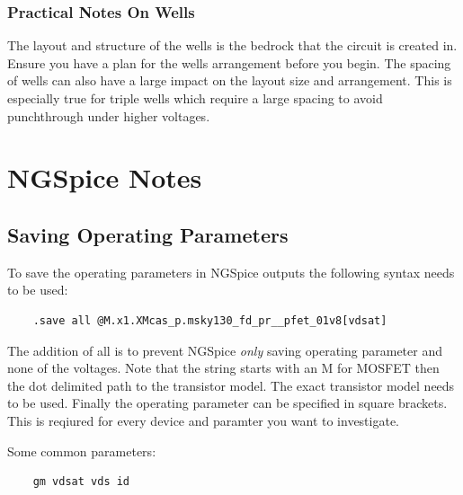 \documentclass[11pt]{article}
\begin{document}
\subsubsection{Practical Notes On Wells}

The layout and structure of the wells is the bedrock that the circuit is created in. Ensure you have a plan for the wells arrangement before you begin. The spacing of wells can also have a large impact on the layout size and arrangement. This is especially true for triple wells which require a large spacing to avoid punchthrough under higher voltages.






\newpage
\section{NGSpice Notes}

\subsection{Saving Operating Parameters}

To save the operating parameters in NGSpice outputs the following syntax needs to be used:

\begin{lstlisting}
    .save all @M.x1.XMcas_p.msky130_fd_pr__pfet_01v8[vdsat]
\end{lstlisting}

The addition of all is to prevent NGSpice \textit{only} saving operating parameter and none of the voltages. Note that the string starts with an M for MOSFET then the dot delimited path to the transistor model. The exact transistor model needs to be used. Finally the operating parameter can be specified in square brackets. This is reqiured for every device and paramter you want to investigate.

Some common parameters:

\begin{lstlisting}
    gm vdsat vds id
\end{lstlisting}
\end{document}
